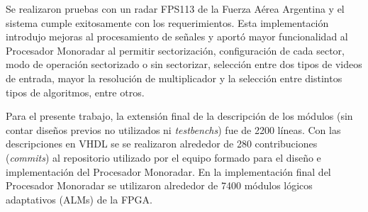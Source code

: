 Se realizaron pruebas con un radar FPS113 de la Fuerza Aérea Argentina y el sistema cumple exitosamente con los requerimientos. Esta implementación introdujo mejoras al procesamiento de señales y aportó mayor funcionalidad al Procesador Monoradar al permitir sectorización, configuración de cada sector, modo de operación sectorizado o sin sectorizar, selección entre dos tipos de videos de entrada, mayor la resolución de multiplicador y la selección entre distintos tipos de algoritmos, entre otros.

 
Para el presente trabajo, la extensión final de la descripción de los módulos (sin contar diseños previos no utilizados ni \textit{testbenchs}) fue de 2200 líneas. Con las descripciones en VHDL se se realizaron alrededor de 280 contribuciones (\textit{commits}) al repositorio utilizado por el equipo formado para el diseño e implementación del Procesador Monoradar. En la implementación final del Procesador Monoradar se utilizaron alrededor de 7400 módulos lógicos adaptativos (ALMs) de la FPGA.
